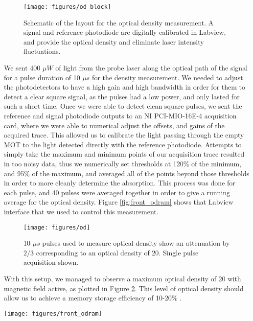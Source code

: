 \begin{figure}[!htb]
 \centering 
 \texttt{[image: figures/od\_block]} 
 \caption[Optical density block diagram]{Schematic of the layout for the optical density measurement.  A signal and reference photodiode are digitally calibrated in Labview, and provide the optical density and eliminate laser intensity fluctuations. } 
 \label{fig:od_block} 
\end{figure}

We sent 400 $\mu W$ of light from the probe laser along the optical path of the signal for a pulse duration of 10 $\mu s$ for the density measurement.  We needed to adjust the photodetectors to have a high gain and high bandwidth in order for them to detect a clear square signal, as the pulses had a low power, and only lasted for such a short time. Once we were able to detect clean square pulses, we sent the reference and signal photodiode outputs to an NI PCI-MIO-16E-4 acquisition card, where we were able to numerical adjust the offsets, and gains of the acquired trace.  This allowed us to calibrate the light passing through the empty MOT to the light detected directly with the reference photodiode.  Attempts to simply take the maximum and minimum points of our acquisition trace resulted in too noisy data, thus we numerically set thresholds at 120\% of the minimum, and 95\% of the maximum, and averaged all of the points beyond those thresholds in order to more cleanly determine the absorption.  This process was done for each pulse, and 40 pulses were averaged together in order to give a running average for the optical density.  Figure \ref{fig:front_odram} shows that Labview interface that we used to control this measurement.

\begin{figure}[!htb]
 \centering 
 \texttt{[image: figures/od]} 
 \caption[Optical density measurement]{10 $\mu s$ pulses used to measure optical density show an attenuation by $2/3$ corresponding to an optical density of 20. Single pulse acquisition shown.}
 \label{fig:od} 
\end{figure}

With this setup, we managed to observe a maximum optical density of 20 with
magnetic field active, as plotted in Figure \ref{fig:od}.  This level of optical
density should allow us to achieve a memory storage efficiency of 10-20\%
\cite{gorshkov2007photon}.

\begin{sidewaysfigure}
 \centering 
 \texttt{[image: figures/front\_odram]} 
 \caption[Optical density and Raman spectroscopy Labview interface]{Labview interface used to program the optical density and raman spectroscopy pulses.} 
 \label{fig:front_odram} 
\end{sidewaysfigure}


